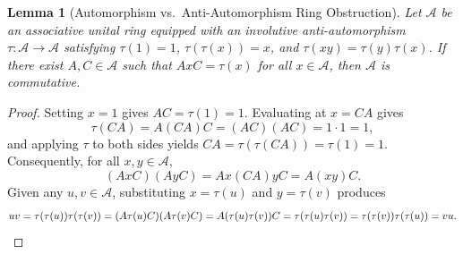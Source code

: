 \documentclass[11pt]{article}
\newtheorem{lemma}[theorem]{Lemma}
\theoremstyle{definition}
\begin{document}
\begin{lemma}[Automorphism vs.\ Anti-Automorphism Ring Obstruction]\label{lem:auto-anti}
Let $\mathcal{A}$ be an associative unital ring equipped with an involutive anti-automorphism $\tau : \mathcal{A} \to \mathcal{A}$ satisfying $\tau(1) = 1$, $\tau(\tau(x)) = x$, and $\tau(xy) = \tau(y)\tau(x)$. If there exist $A, C \in \mathcal{A}$ such that $A x C = \tau(x)$ for all $x \in \mathcal{A}$, then $\mathcal{A}$ is commutative.
\end{lemma}
\begin{proof}
Setting $x = 1$ gives $A C = \tau(1) = 1$. Evaluating at $x = C A$ gives
\[
  \tau(C A) = A (C A) C = (A C)(A C) = 1\cdot 1 = 1,
\]
and applying $\tau$ to both sides yields $C A = \tau(\tau(C A)) = \tau(1) = 1$. Consequently, for all $x, y \in \mathcal{A}$,
\[
  (A x C)(A y C) = A x (C A) y C = A (x y) C.
\]
Given any $u, v \in \mathcal{A}$, substituting $x = \tau(u)$ and $y = \tau(v)$ produces
\[
  u v = \tau(\tau(u))\tau(\tau(v)) = (A\tau(u)C)(A\tau(v)C) = A(\tau(u)\tau(v))C = \tau(\tau(u)\tau(v)) = \tau(\tau(v))\tau(\tau(u)) = v u. \qedhere
\]
\end{proof}
\end{document}
